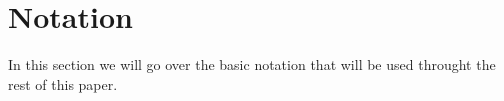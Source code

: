 \section{Notation}

In this section we will go over the basic notation that will be used throught the rest of this paper. 


